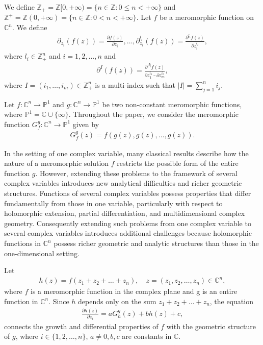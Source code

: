 \documentclass[11pt,reqno]{amsart}
\numberwithin{equation}{section}
\begin{document}
We define $\mathbb{Z}_+=\mathbb{Z}[0,+\infty)=\{n\in \mathbb{Z}: 0\leq n<+\infty\}$ and $\mathbb{Z}^+=\mathbb{Z}(0,+\infty)=\{n\in \mathbb{Z}: 0<n<+\infty\}$. Let $f$ be a meromorphic function on $\mathbb{C}^n$. 
We define
\begin{align*}
\displaystyle \partial_{z_i}(f(z))=\frac{\partial f(z)}{\partial z_i},\ldots,\partial^{l_i}_{z_i}(f(z))=\frac{\partial^{l_i} f(z)}{\partial z_i^{l_i}},
\end{align*}
where $l_i\in \mathbb{Z}^n_+$ and $i=1,2,\ldots,n$ and  
\begin{align*}
\displaystyle \partial^{I}(f(z))=\frac{\partial^{|I|}f(z)}{\partial z_1^{i_1}\cdots \partial z_m^{i_n}},
\end{align*}
where $I=(i_1,\ldots,i_m)\in\mathbb{Z}^n_+$ is a multi-index such that $|I|=\sum_{j=1}^n i_j$.


\medskip
Let $f:\mathbb{C}^n\to\mathbb{P}^1$ and $g:\mathbb{C}^n\to \mathbb{P}^1$ be two non-constant meromorphic functions, where $\mathbb{P}^1=\mathbb{C}\cup\{\infty\}$. Throughout the paper, we consider the meromorphic function $G^g_f:\mathbb{C}^n\to \mathbb{P}^1$ given by
\begin{align}\label{eq}
G^g_f(z)=f(g(z),g(z),\ldots,g(z)).
\end{align}

 
In the setting of one complex variable, many classical results describe how the nature of a meromorphic solution $f$ restricts the possible form of the entire function $g$. However, extending these problems to the framework of several complex variables introduces new analytical difficulties and richer geometric structures. Functions of several complex variables possess properties that differ fundamentally from those in one variable, particularly with respect to holomorphic extension, partial differentiation, and multidimensional complex geometry. Consequently extending such problems from one complex variable to several complex variables introduces additional challenges because holomorphic functions in $\mathbb{C}^n$ possess richer geometric and analytic structures than those in the one-dimensional setting.

\medskip
Let
\begin{align*}
h(z)=f(z_1+z_2+\ldots+z_n),\quad z=(z_1,z_2,\ldots,z_n)\in\mathbb{C}^n,
\end{align*}
where $f$ is a meromorphic function in the complex plane and g is an entire function in $\mathbb{C}^n$. Since $h$ depends only on the sum $z_1+z_2+\ldots+z_n$, the equation
\begin{align}\label{Eq}
\frac{\partial h(z)}{\partial z_i}=a G^g_{h}(z)+bh(z)+c,
\end{align}
connects the growth and differential properties of $f$ with the geometric structure of $g$, where $i\in\{1,2,\ldots,n\}$, $a\neq 0, b,c$ are constants in $\mathbb{C}$. 
\end{document}
